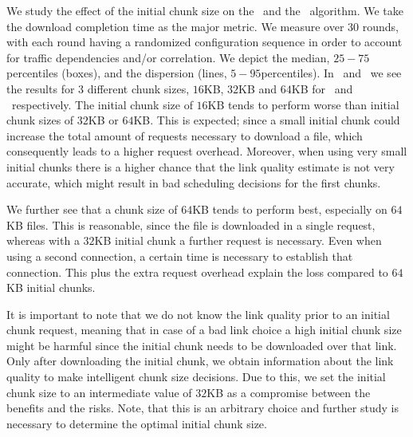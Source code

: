 We study the effect of the initial chunk size on the \algalpha~and the \algslice~algorithm. 
We take the download completion time as the major metric. 
We measure over $30$ rounds, with each round having a randomized configuration sequence in order to account for traffic dependencies and/or correlation. 
We depict the median, $25-75$\perc percentiles (boxes), and the dispersion (lines, $5-95$\perc percentiles). 
In~ and~ we see the results for 3 different chunk sizes, \ie $16$KB, $32$KB and $64$KB for \algalpha~and \algslice~respectively. 
The initial chunk size of $16$KB tends to perform worse than initial chunk sizes of $32$KB or $64$KB. 
This is expected; since a small initial chunk could increase the total amount of requests necessary to download a file, which consequently leads to a higher request overhead. 
Moreover, when using very small initial chunks there is a higher chance that the link quality estimate is not very accurate, which might result in bad scheduling decisions for the first chunks. 

We further see that a chunk size of $64$KB tends to perform best, especially on $64$KB files. 
This is reasonable, since the file is downloaded in a single request, whereas with a $32$KB initial chunk a further request is necessary. 
Even when using a second connection, a certain time is necessary to establish that connection. 
This plus the extra request overhead explain the loss compared to $64$KB initial chunks. 

It is important to note that we do not know the link quality prior to an initial chunk request, meaning that in case of a bad link choice a high initial chunk size might be harmful since the initial chunk needs to be downloaded over that link. 
Only after downloading the initial chunk, we obtain information about the link quality to make intelligent chunk size decisions. 
Due to this, we set the initial chunk size to an intermediate value of $32$KB as a compromise between the benefits and the risks. 
Note, that this is an arbitrary choice and further study is necessary to determine the optimal initial chunk size. 
